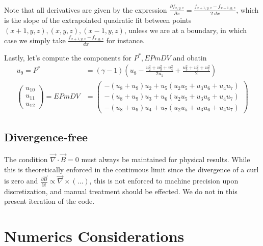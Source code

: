 \documentclass[10pt]{article}
\newcommand{\pd}[2]{\frac{\partial#1}{\partial#2}}
\begin{document}
Note that all derivatives are given by the expression $\pd{f_{x,y,z}}{x} = \frac{f_{x+1,y,z} - f_{x-1,y,z}}{2\;dx}$, which is the slope of the extrapolated quadratic fit between points $(x+1,y,z),(x,y,z),(x-1,y,z)$, unless we are at a boundary, in which case we simply take $\frac{f_{x+1,y,z} - f_{x,y,z}}{dx}$ for instance.

Lastly, let's compute the components for $P^*, EPmDV$ and obatin
\begin{align}
    u_9 = P^* &= (\gamma - 1)\left( u_8 - \frac{u_2^2 + u_3^2 + u_4^2}{2u_1} + \frac{u_5^2 + u_6^2 + u_7^2}{2} \right)\\
    \begin{pmatrix} u_{10}\\u_{11} \\ u_{12}
    \end{pmatrix} = EPmDV &=
    \begin{pmatrix} 
        -(u_8 + u_9)u_2 + u_5(u_2u_5 + u_3u_6 + u_4u_7)\\
        -(u_8 + u_9)u_3 + u_6(u_2u_5 + u_3u_6 + u_4u_7)\\
        -(u_8 + u_9)u_4 + u_7(u_2u_5 + u_3u_6 + u_4u_7)
    \end{pmatrix}
\end{align}

\subsection{Divergence-free}

The condition $\vec{\nabla} \cdot \vec{B} = 0$ must always be maintained for physical results. While this is theoretically enforced in the continuous limit since the divergence of a curl is zero and $\pd{\vec{B}}{t} \propto \vec{\nabla} \times (\dots)$, this is not enforced to machine precision upon discretization, and manual treatment should be effected. We do not in this present iteration of the code.

\section{Numerics Considerations}
\end{document}
